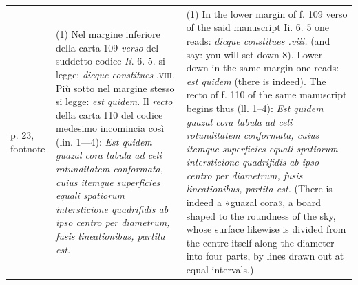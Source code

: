 \documentclass[11pt]{article}
\begin{document}
\noindent\begin{tabular}{@{}p{}@{\hspace{2mm}}p{}@{\hspace{3mm}}p{}@{}}{\footnotesize p. 23, footnote} & {\small (1) Nel margine inferiore della carta 109 \textit{verso} del suddetto codice \textit{Ii}. 6. 5. si legge: \textit{dicque constitues} .\textsc{viii}. Più sotto nel margine stesso si legge: \textit{est quidem}. Il \textit{recto} della carta 110 del codice medesimo incomincia così (lin. 1—4): \textit{Est quidem guazal cora tabula ad celi rotunditatem conformata, cuius itemque} \textit{superficies equali spatiorum intersticione quadrifidis ab ipso centro per diametrum, fusis lineationibus, partita est.}} & (1) In the lower margin of f. 109 verso of the said manuscript Ii. 6. 5 one reads: \textit{dicque constitues .viii.} (and say: you will set down 8). Lower down in the same margin one reads: \textit{est quidem} (there is indeed). The recto of f. 110 of the same manuscript begins thus (ll. 1–4): \textit{Est quidem guazal cora tabula ad celi rotunditatem conformata, cuius itemque superficies equali spatiorum intersticione quadrifidis ab ipso centro per diametrum, fusis lineationibus, partita est.} (There is indeed a «guazal cora», a board shaped to the roundness of the sky, whose surface likewise is divided from the centre itself along the diameter into four parts, by lines drawn out at equal intervals.)\end{tabular}\par\smallskip
\end{document}
